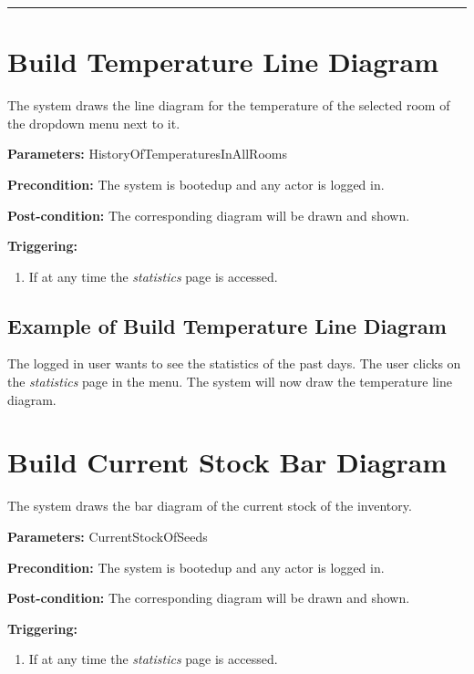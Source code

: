  \hfill
\vspace{0.5cm}
\hrule














\break
\section{Build Temperature Line Diagram}
\label{operation:BuildTemperatureDiagram}
The system draws the line diagram for the temperature of the selected room of
the dropdown menu next to it.

\begin{description}

\item \textbf{Parameters:} HistoryOfTemperaturesInAllRooms
\item \textbf{Precondition:} The system is bootedup and any actor is logged in.
\item \textbf{Post-condition:} The corresponding diagram will be drawn and
shown.

\item \textbf{Triggering:}
\begin{enumerate}
\item If at any time the \emph{statistics} page is accessed.
\end{enumerate}
\end{description}

\subsection{Example of Build Temperature Line Diagram}
The logged in user wants to see the statistics of the past days.
The user clicks on the \emph{statistics} page in the menu.
The system will now draw the temperature line diagram.




\section{Build Current Stock Bar Diagram}
\label{operation:BuildCurrentStockDiagram}
The system draws the bar diagram of the current stock of the inventory.

\begin{description}

\item \textbf{Parameters:} CurrentStockOfSeeds
\item \textbf{Precondition:} The system is bootedup and any actor is logged in.
\item \textbf{Post-condition:} The corresponding diagram will be drawn and
shown.

\item \textbf{Triggering:}
\begin{enumerate}
\item If at any time the \emph{statistics} page is accessed.
\end{enumerate}
\end{description}

